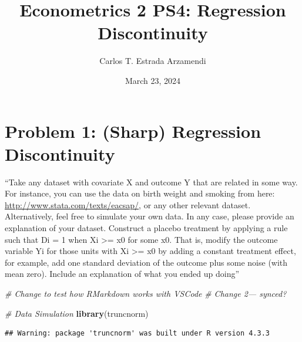 \documentclass[]{article}
\title{Econometrics 2 PS4: Regression Discontinuity}
\author{Carlos T. Estrada Arzamendi}
\date{March 23, 2024}
\newenvironment{Shaded}{\begin{snugshade}}{\end{snugshade}}
\newcommand{\KeywordTok}[1]{\textcolor[rgb]{0.13,0.29,0.53}{\textbf{{#1}}}}
\newcommand{\CommentTok}[1]{\textcolor[rgb]{0.56,0.35,0.01}{\textit{{#1}}}}
\newcommand{\NormalTok}[1]{{#1}}
\begin{document}
\maketitle

\section{Problem 1: (Sharp) Regression
Discontinuity}\label{problem-1-sharp-regression-discontinuity}

``Take any dataset with covariate X and outcome Y that are related in
some way. For instance, you can use the data on birth weight and smoking
from here: \url{http://www.stata.com/texts/eacsap/}, or any other
relevant dataset. Alternatively, feel free to simulate your own data. In
any case, please provide an explanation of your dataset. Construct a
placebo treatment by applying a rule such that Di = 1 when Xi
\textgreater{}= x0 for some x0. That is, modify the outcome variable Yi
for those units with Xi \textgreater{}= x0 by adding a constant
treatment effect, for example, add one standard deviation of the outcome
plus some noise (with mean zero). Include an explanation of what you
ended up doing''

\begin{Shaded}
\begin{Highlighting}[]
\CommentTok{# Change to test how RMarkdown works with VSCode}
\CommentTok{# Change 2--- synced?}

\CommentTok{# Data Simulation}
\KeywordTok{library}\NormalTok{(truncnorm)}
\end{Highlighting}
\end{Shaded}

\begin{verbatim}
## Warning: package 'truncnorm' was built under R version 4.3.3
\end{verbatim}
\end{document}
